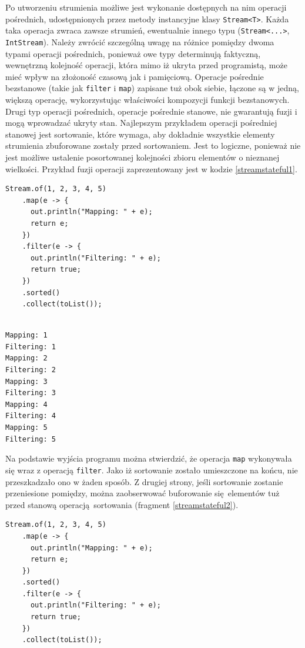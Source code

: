 \documentclass[12pt,twoside,openright]{extarticle}
\begin{document}
    Po utworzeniu strumienia możliwe jest wykonanie dostępnych na nim operacji pośrednich, udostępnionych przez metody instancyjne klasy \texttt{Stream<T>}. Każda taka operacja zwraca zawsze strumień, ewentualnie innego typu (\texttt{Stream<...>}, \texttt{IntStream}). Należy zwrócić szczególną uwagę na różnice pomiędzy dwoma typami operacji pośrednich, ponieważ owe typy determinują faktyczną, wewnętrzną kolejność operacji, która mimo iż ukryta przed programistą, może mieć wpływ na złożoność czasową jak i pamięciową. Operacje pośrednie bezstanowe (takie jak \texttt{filter} i \texttt{map}) zapisane tuż obok siebie, łączone są w jedną, większą operację, wykorzystując właściwości kompozycji funkcji bezstanowych. Drugi typ operacji pośrednich, operacje pośrednie stanowe, nie gwarantują fuzji i mogą wprowadzać ukryty stan. Najlepszym przykładem operacji pośredniej stanowej jest sortowanie, które wymaga, aby dokładnie wszystkie elementy strumienia zbuforowane zostały przed sortowaniem. Jest to logiczne, ponieważ nie jest możliwe ustalenie posortowanej kolejności zbioru elementów o nieznanej wielkości. Przykład fuzji operacji zaprezentowany jest w kodzie \ref{streamstateful1}.

\begin{lstlisting}[label=streamstateful1, caption=Fuzja operacji bezstanowych]
Stream.of(1, 2, 3, 4, 5)
    .map(e -> {
      out.println("Mapping: " + e);
      return e;
    })
    .filter(e -> {
      out.println("Filtering: " + e);
      return true;
    })
    .sorted()
    .collect(toList());

\end{lstlisting}


\begin{verbatim}

Mapping: 1
Filtering: 1
Mapping: 2
Filtering: 2
Mapping: 3
Filtering: 3
Mapping: 4
Filtering: 4
Mapping: 5
Filtering: 5

\end{verbatim}

    Na podstawie wyjścia programu można stwierdzić, że operacja \texttt{map} wykonywała się wraz z operacją \texttt{filter}. Jako iż sortowanie zostało umieszczone na końcu, nie przeszkadzało ono w żaden sposób. Z drugiej strony, jeśli sortowanie zostanie przeniesione pomiędzy, można zaobserwować buforowanie się elementów tuż przed stanową operacją sortowania (fragment \ref{streamstateful2}).

\begin{lstlisting}[label=streamstateful2, caption=Brak fuzji operacji stanowych]
Stream.of(1, 2, 3, 4, 5)
    .map(e -> {
      out.println("Mapping: " + e);
      return e;
    })
    .sorted()
    .filter(e -> {
      out.println("Filtering: " + e);
      return true;
    })
    .collect(toList());
\end{lstlisting}
\end{document}

